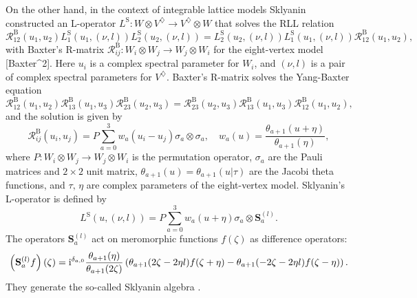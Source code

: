 On the other hand, in the context of integrable lattice models Sklyanin
constructed an L-operator $L^{\mathrm{S}}:W\otimes V^{\diamondsuit}\rightarrow V^{\diamondsuit}\otimes W$
that solves the RLL relation \cite{MR684124}
\begin{equation}
    \mathcal{R}_{12}^{\mathrm{B}}(u_{1},u_{2})
    L_{1}^{\mathrm{S}}\left(u_{1},\left(\nu,l\right)\right)
    L_{2}^{\mathrm{S}}\left(u_{2},\left(\nu,l\right)\right)
      =
          L_{2}^{\mathrm{S}}\left(u_{2},\left(\nu,l\right)\right)
          L_{1}^{\mathrm{S}}\left(u_{1},\left(\nu,l\right)\right)
          \mathcal{R}_{12}^{\mathrm{B}}(u_{1},u_{2}),
\end{equation}
with Baxter's R-matrix $\mathcal{R}_{ij}^{\mathrm{B}}:W_{i}\otimes W_{j}\rightarrow W_{j}\otimes W_{i}$
for the eight-vertex model {[}Baxter\textasciicircum 2{]}. Here $u_{i}$
is a complex spectral parameter for $W_{i}$, and $\left(\nu,l\right)$
is a pair of complex spectral parameters for $V^{\diamondsuit}$.
Baxter's R-matrix solves the Yang-Baxter equation
\begin{equation}
    \mathcal{R}_{12}^{\mathrm{B}}(u_{1},u_{2})
    \mathcal{R}_{13}^{\mathrm{B}}(u_{1},u_{3})
    \mathcal{R}_{23}^{\mathrm{B}}(u_{2},u_{3})
      =
        \mathcal{R}_{23}^{\mathrm{B}}(u_{2},u_{3})
        \mathcal{R}_{13}^{\mathrm{B}}(u_{1},u_{3})
        \mathcal{R}_{12}^{\mathrm{B}}(u_{1},u_{2}),
\end{equation}
 and the solution is given by 
\begin{equation}
    \mathcal{R}_{ij}^{\mathrm{B}}(u_{i},u_{j})
      =  P\sum_{a=0}^{3}w_{a}(u_{i}-u_{j})  \sigma_{a}  \otimes  \sigma_{a},
        \quad  w_{a}(u)  =  \frac{\theta_{a+1}(u+\eta)}{\theta_{a+1}(\eta)},
\end{equation}
 where $P:W_{i}\otimes W_{j}\rightarrow W_{j}\otimes W_{i}$ is the
permutation operator, $\sigma_{a}$ are the Pauli matrices and $2\times2$
unit matrix, $\theta_{a+1}(u)=\theta_{a+1}(u|\tau)$ are the Jacobi
theta functions, and $\tau,\,\eta$ are complex parameters of the
eight-vertex model. Sklyanin's L-operator is defined by 
\begin{equation}
    L^{\mathrm{S}}\left(u,\left(\nu,l\right)\right)  
      =  P\sum_{a=0}^{3}w_{a}(u+\eta)  \sigma_{a}  \otimes  \mathbf{S}_{a}^{(l)}.
\end{equation}
The operators $\mathbf{S}_{a}^{(l)}$ act on meromorphic functions
$f(\zeta)$ as difference operators:
\begin{equation}
    \left(\mathbf{S}_{a}^{(l)}f\right)(\zeta)  
      =  \mathrm{i}^{\delta_{a,0}}\frac{\theta_{a+1}(\eta)}{\theta_{a+1}(2\zeta)}
          \left(\theta_{a+1}(2\zeta-2\eta l)f(\zeta+\eta)-\theta_{a+1}(-2\zeta-2\eta l)f(\zeta-\eta)\right).
\end{equation}
 They generate the so-called Sklyanin algebra \cite{MR725414}.

